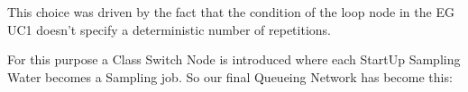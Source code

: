 This choice was driven by the fact that the condition of the loop node in the EG UC1 doesn't specify a deterministic number of repetitions.

\begin{center}
\end{center}
\bigskip
{}
\bigskip

For this purpose a Class Switch Node is introduced where each StartUp Sampling Water becomes a Sampling job.
So our final Queueing Network has become this:
 
\bigskip
\begin{center}
\end{center}
\bigskip
{}



